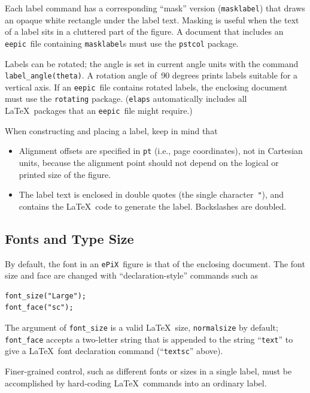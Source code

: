 \documentclass[12pt]{report}
\newcommand{\code}[1]{\texttt{#1}}
\newcommand{\ePiX}{\code{ePiX}}
\newcommand{\eepic}{\code{eepic}}
\begin{document}
Each label command has a corresponding ``mask'' version
(\code{masklabel}) that draws an opaque white rectangle under the
label text. Masking is useful when the text of a label sits in a
cluttered part of the figure. A document that includes an \eepic\ file
containing \code{masklabel}s must use the \code{pstcol} package.

 Labels can be rotated; the
angle is set in current angle units with the command
\code{label\_angle(theta)}. A rotation angle of~90 degrees prints
labels suitable for a vertical axis.  If an \eepic\ file contains
rotated labels, the enclosing document must use the \code{rotating}
package. (\code{elaps} automatically includes all \LaTeX\ packages
that an \eepic\ file might require.)

When constructing and placing a label, keep in mind that
\begin{itemize}
\item Alignment offsets are specified in \code{pt} (i.e., page
  coordinates), not in Cartesian units, because the alignment point
  should not depend on the logical or printed size of the figure.

\item The label text is enclosed in double quotes (the single
  character~\code{"}), and contains the \LaTeX\ code to generate the
  label. Backslashes are doubled.
\end{itemize}


\subsection*{Fonts and Type Size}

By default, the font in an \ePiX\ figure is that of the enclosing
document. The font size and face are changed with
``declaration-style'' commands such as
\begin{verbatim}
font_size("Large");
font_face("sc");
\end{verbatim}
The argument of \verb+font_size+ is a valid \LaTeX\ size,
\code{normalsize} by default; \verb+font_face+ accepts a two-letter
string that is appended to the string ``\code{text}'' to give a
\LaTeX\ font declaration command (``\code{textsc}'' above).

Finer-grained control, such as different fonts or sizes in a single
label, must be accomplished by hard-coding \LaTeX\ commands into an
ordinary label.
\end{document}
